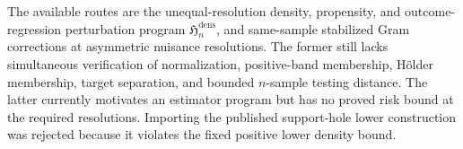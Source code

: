 The available routes are the unequal-resolution density, propensity, and
outcome-regression perturbation program \(\mathfrak H_n^{\mathrm{dens}}\), and
same-sample stabilized Gram corrections at asymmetric nuisance resolutions.
The former still lacks simultaneous verification of normalization, positive-band
membership, H\"older membership, target separation, and bounded \(n\)-sample
testing distance.  The latter currently motivates an estimator program but has
no proved risk bound at the required resolutions.  Importing the published
support-hole lower construction was rejected because it violates the fixed
positive lower density bound.